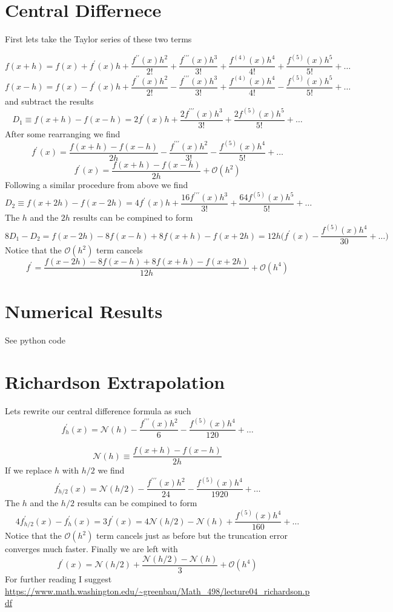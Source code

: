 \documentclass{article}
\begin{document}
\section{Central Differnece}

First lets take the Taylor series of these two terms

\[
    f(x + h) = f(x) + f^{\prime}(x) h + 
    \frac{f^{\prime\prime}(x) h^2}{2!} +
    \frac{f^{\prime\prime\prime}(x) h^3}{3!}+
    \frac{f^{(4)}(x) h^4}{4!}+
    \frac{f^{(5)}(x) h^5}{5!}+ \dots
\]
\[
    f(x - h) = f(x) - f^{\prime}(x) h + 
    \frac{f^{\prime\prime}(x) h^2}{2!} -
    \frac{f^{\prime\prime\prime}(x) h^3}{3!}+
    \frac{f^{(4)}(x) h^4}{4!}-
    \frac{f^{(5)}(x) h^5}{5!}+ \dots
\]
and subtract the results
\[
    D_1 \equiv f(x+h) - f(x-h) = 
    2 f^{\prime}(x) h + 
    \frac{2f^{\prime\prime\prime}(x) h^3}{3!}+
    \frac{2f^{(5)}(x) h^5}{5!}+ \dots
\]
After some rearranging we find
\[
    f^{\prime}(x) = \frac{f(x+h)-f(x-h)}{2h} -
    \frac{f^{\prime\prime\prime}(x) h^2}{3!}-
    \frac{f^{(5)}(x) h^4}{5!}+ \dots
\]
\[
        f^{\prime}(x) = \frac{f(x+h)-f(x-h)}{2h} + \mathcal{O}(h^2)
\]
Following a similar procedure from above we find 
\[
    D_2 \equiv f(x+2h) - f(x-2h) = 
    4 f^{\prime}(x) h + 
    \frac{16f^{\prime\prime\prime}(x) h^3}{3!}+
    \frac{64f^{(5)}(x) h^5}{5!}+ \dots
\]
The $h$ and the $2h$ results can be compined to form
\[
    8D_1 - D_2 = f(x-2h) -8f(x-h) + 8f(x+h) - f(x+2h) = 
    12h \bigg(f^{\prime}(x) - \frac{f^{(5)}(x) h^4}{30}+ \dots \bigg)
\]
Notice that the $\mathcal{O}(h^2)$ term cancels
\[
f^{\prime} = 
    \frac{f(x-2h) -8f(x-h) + 8f(x+h) - f(x+2h)}{12h}+\mathcal{O}(h^4)
\]

\section{Numerical Results}

See python code

\section{Richardson Extrapolation}


Lets rewrite our central difference formula as such
\[
    f^{\prime}_{h}(x) = \mathcal{N}(h) -
    \frac{f^{\prime\prime\prime}(x) h^2}{6}-
    \frac{f^{(5)}(x) h^4}{120}+ \dots
\]

\[
        \mathcal{N}(h) \equiv  \frac{f(x+h)-f(x-h)}{2h}
\]
If we replace $h$ with $h/2$ we find
\[
    f^{\prime}_{h/2}(x) = \mathcal{N}(h/2) -
    \frac{f^{\prime\prime\prime}(x) h^2}{24}-
    \frac{f^{(5)}(x) h^4}{1920}+ \dots
\]
The $h$ and the $h/2$ results can be compined to form
\[
    4f^{\prime}_{h/2}(x)-f^{\prime}_{h}(x)   = 
    3f^{\prime}(x) = 4\mathcal{N}(h/2) - \mathcal{N}(h) +
    \frac{f^{(5)}(x) h^4}{160}+ \dots
\]
Notice that the $\mathcal{O}(h^2)$ term cancels just as before but the
truncation error converges much faster. Finally we are left with
\[
    f^{\prime}(x) = \mathcal{N}(h/2)+ 
    \frac{\mathcal{N}(h/2) - \mathcal{N}(h)}{3}
    + \mathcal{O}(h^4)
\]
For further reading I suggest
\url{https://www.math.washington.edu/~greenbau/Math_498/lecture04_richardson.pdf}
\end{document}
